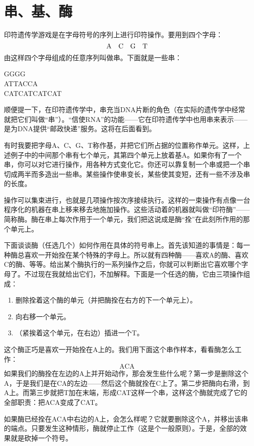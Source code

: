 \section{串、基、酶}

印符遗传学游戏是在字母符号的序列上进行印符操作。要用到四个字母：
\[
\text{A\quad C\quad G\quad T}
\]
由这样四个字母组成的任意序列叫做串。下面就是一些串：
\begin{center}
GGGG\\
ATTACCA\\
CATCATCATCAT
\end{center}
顺便提一下，在印符遗传学中，串充当DNA片断的角色（在实际的遗传学中经常就把它们叫做“串”）。“信使RNA”的功能——它在印符遗传学中也用串来表示——是为DNA提供“邮政快递”服务。这将在后面看到。

有时我要把字母A、C、G、T称作基，并把它们所占据的位置称作单元。这样，上述例子中的中间那个串有七个单元，其第四个单元上放着基A。如果你有了一个串，你可以对它进行操作，用各种方式变化它。你还可以靠复制一个串或把一个串切成两半而多造出一些串。某些操作使串变长，某些使其变短，还有一些不涉及串的长度。

操作可以集束进行，也就是几项操作按次序接续执行。这样的一束操作有点像一台程序化的机器在串上移来移去地施加操作。这些活动着的机器就叫做“印符酶”——简称酶。酶在串上每次作用于一个单元，我们把这说成是酶“拴”在此刻所作用的那个单元上。

下面谈谈酶（任选几个）如何作用在具体的符号串上。首先该知道的事情是：每一种酶总喜欢一开始拴在某个特殊的字母上。所以就有四种酶——喜欢A的酶、喜欢C的酶、等等。给出某个酶执行的一系列操作之后，你就可以判断出它喜欢哪个字母了。不过现在我就给出它们，不加解释。下面是一个任选的酶，它由三项操作组成：
\begin{enumerate}
\item 删除拴着这个酶的单元（并把酶拴在右方的下一个单元上）。
\item 向右移一个单元。
\item （紧挨着这个单元，在右边）插进一个T。
\end{enumerate}
这个酶正巧是喜欢一开始拴在A上的。我们用下面这个串作样本，看看酶怎么工作：
\[
\text{ACA}
\]
如果我们的酶拴在左边的A上并开始动作，那会发生些什么呢？第一步是删除这个A，于是我们是在CA的左边——然后这个酶就拴在C上了。第二步把酶向右滑，到A上。而第三步就把T加在末端，形成CAT这样一个串，这样这个酶就完成了它的全部职责：把ACA变成了CAT。

如果酶已经拴在ACA中右边的A上，会怎么样呢？它就要删除这个A，并移出该串的端点。只要发生这种情形，酶就停止工作（这是个一般原则）。于是，全部的效果就是砍掉一个符号。

